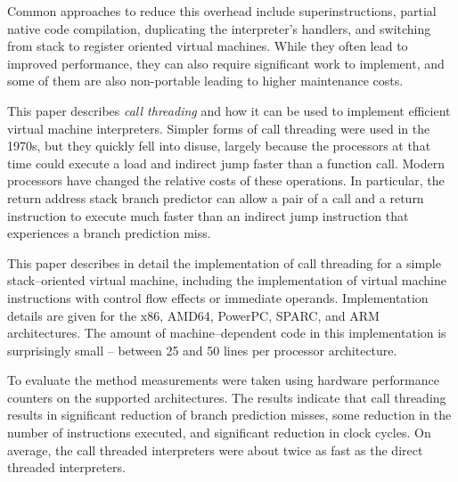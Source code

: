 \documentclass[10pt,a4paper]{article}
\begin{document}
Common approaches to reduce this overhead include
superinstructions, partial native code compilation,
duplicating the interpreter's handlers, and switching
from stack to register oriented virtual machines.
While they often lead to improved performance, they can
also require significant work to implement, and some of
them are also non-portable leading to higher maintenance
costs.

This paper describes \emph{call threading} and how it can
be used to implement efficient virtual machine interpreters.
Simpler forms of call threading were used in the 1970s,
but they quickly fell into disuse, largely because the
processors at that time could execute a load and indirect jump
faster than a function call.
Modern processors have changed the relative costs of these
operations. In particular, the return address stack branch
predictor can allow a pair of a call and a return instruction
to execute much faster than an indirect jump instruction that
experiences a branch prediction miss.

This paper describes in detail the implementation of call
threading for a simple stack--oriented virtual machine,
including the implementation of virtual machine instructions with
control flow effects or immediate operands. Implementation details
are given for the x86, AMD64, PowerPC, SPARC, and ARM architectures.
The amount of machine--dependent code in this implementation is
surprisingly small -- between 25 and 50 lines per processor architecture.

To evaluate the method measurements were taken using hardware performance
counters on the supported architectures. The results indicate that
call threading results in significant reduction of branch
prediction misses, some reduction in the number of instructions
executed, and significant reduction in clock cycles.
On average, the call threaded interpreters were about twice
as fast as the direct threaded interpreters.
%
\end{document}
